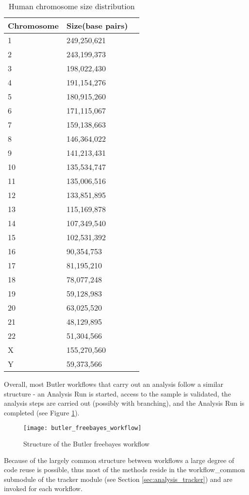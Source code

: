 \begin{table}[H]
\renewcommand{\arraystretch}{1.2} 
\centering
\begin{tabular}{@{}lll@{}}
\toprule
Chromosome & Size(base pairs)\\
\midrule
1 & 249,250,621\\
2 & 243,199,373\\
3 & 198,022,430\\
4 & 191,154,276\\
5 & 180,915,260\\
6 & 171,115,067\\
7 & 159,138,663\\
8 & 146,364,022\\
9 & 141,213,431\\
10 & 135,534,747\\
11 & 135,006,516\\
12 & 133,851,895\\
13 & 115,169,878\\
14 & 107,349,540\\
15 & 102,531,392\\
16 & 90,354,753\\
17 & 81,195,210\\
18 & 78,077,248\\
19 & 59,128,983\\
20 & 63,025,520\\
21 & 48,129,895\\
22 & 51,304,566\\
X & 155,270,560\\
Y & 59,373,566\\
\bottomrule
\end{tabular}
\caption{Human chromosome size distribution}
\label{tab:chromosome_sizes}
\end{table}

Overall, most Butler workflows that carry out an analysis follow a similar structure - an Analysis Run is started, access to the sample is validated, the analysis steps are carried out (possibly with branching), and the Analysis Run is completed (see Figure \ref{fig:butler_freebayes_workflow}).

\begin{figure}[H]
\texttt{[image: butler\_freebayes\_workflow]}
\centering
\caption {Structure of the Butler freebayes workflow}
\label{fig:butler_freebayes_workflow}
\end{figure}

Because of the largely common structure between workflows a large degree of code reuse is possible, thus most of the methods reside in the workflow\_common submodule of the tracker module (see Section \ref{sec:analysis_tracker}) and are invoked for each workflow.

